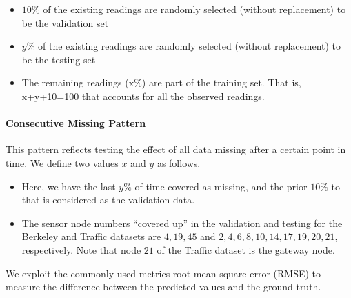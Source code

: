 \begin{itemize}
\item $10\%$ of the existing readings are randomly selected (without replacement) to be the validation set
\item $y\%$ of the existing readings are randomly selected (without replacement) to be the testing set
\item The remaining readings (x\%) are part of the training set. That is, x+y+10=100 that accounts for all the observed readings.
\end{itemize}
\paragraph*{Consecutive Missing Pattern}

This pattern reflects testing the effect of all data missing after a certain point in time.
We define two values $x$ and $y$ as follows.

\begin{itemize}
\item Here, we have the last $y\%$ of time covered as missing, and the prior $10\%$ to that is considered as the validation data.
\item The sensor node numbers ``covered up'' in the validation and testing for the Berkeley and Traffic datasets are ${4,19,45}$ and ${2,4,6,8,10,14,17,19,20,21}$, respectively.
Note that node $21$ of the Traffic dataset is the gateway node.
\end{itemize}
We exploit the commonly used metrics root-mean-square-error (RMSE) to measure the difference between the predicted values and the ground truth. 